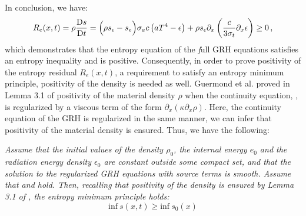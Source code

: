 \documentclass[times,doublespace]{fldauth}%
\begin{document}
In conclusion, we have: 
\begin{equation} \label{eq:ineq_ent_eq}
R_e(x,t) = \rho \frac{\textrm{D} s}{\textrm{D} t} = \Big( \rho s_\epsilon -s_e \Big)  \sigma_a c \left( a T^4 - \epsilon \right) +   \rho s_\epsilon \partial_x \left( \frac{c}{3 \sigma_t} \partial_x \epsilon \right) \geq 0 \,,
\end{equation}
which demonstrates that the entropy equation of the {\emph full} GRH equations satisfies an entropy inequality and is positive. Consequently, in order to prove positivity of the entropy residual $R_e(x,t)$, a requirement to satisfy an entropy minimum principle, positivity of the density is needed as well. Guermond et al. proved in Lemma 3.1 of \cite{jlg} positivity of the material density $\rho$ when the continuity equation, , is regularized by a viscous term of the form $\partial_x ( \kappa \partial_x \rho )$. Here, the continuity equation of the GRH is regularized in the same manner, we can infer that positivity of the material density is ensured. Thus, we have the following:
%
\begin{theorem}
\emph{Assume that the initial values of the density $\rho_0$, the internal energy $e_0$ and the radiation energy density $\epsilon_0$ are constant outside some compact set, and that the solution to the regularized GRH equations with source terms is smooth. Assume that  and  hold. Then, recalling that positivity of the density is ensured by Lemma 3.1 of \cite{jlg}, the entropy minimum principle holds:
\begin{equation}
\text{inf} \ s(x,t) \geq \text{inf} \ s_0(x)
\end{equation}}
\end{theorem}
%
\end{document}
